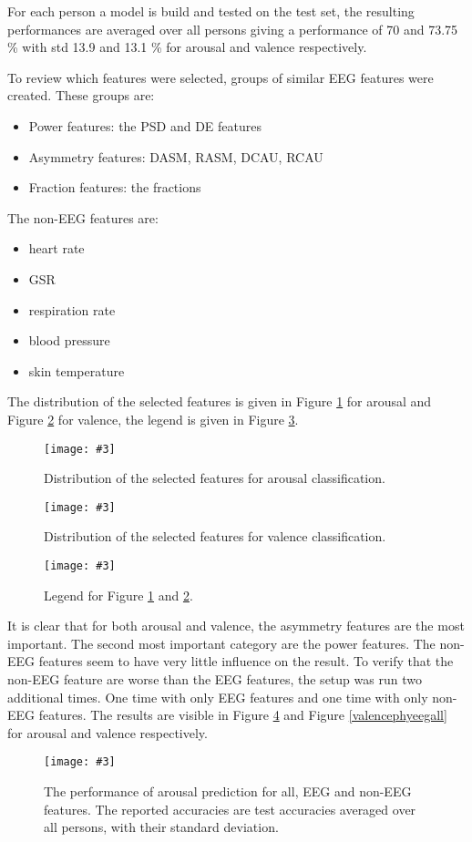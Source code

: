 \documentclass[12pt,journal,compsoc]{IEEEtran}
\newcommand{\npar}{\par \vspace{2.3ex plus 0.3ex minus 0.3ex}}
\newcommand{\mijnfiguur}[4][H]{            %
    \begin{figure}[#1]                      %
        \begin{center}                      %
            \texttt{[image: \#3]}        %
            \caption{#4\label{#3}}          %
        \end{center}
    \end{figure}
    }
\begin{document}
\npar

For each person a model is build and tested on the test set, the resulting performances are averaged over all persons giving a performance of  70 and 73.75 \% with std 13.9 and 13.1 \% for arousal and valence respectively. 

\npar

To review which features were selected, groups of similar EEG features were created. These groups are:
\begin{itemize}
\item Power features: the PSD and DE features
\item Asymmetry features: DASM, RASM, DCAU, RCAU
\item Fraction features: the fractions
\end{itemize}
The non-EEG features are:
\begin{itemize}
\item heart rate
\item GSR
\item respiration rate
\item blood pressure
\item skin temperature
\end{itemize}
The distribution of the selected features is given in Figure \ref{arousalALLRF} for arousal and Figure \ref{valenceALLRF} for valence, the legend is given in Figure \ref{legend}.

\mijnfiguur{width=0.25\textwidth}{arousalALLRF}{Distribution of the selected features for arousal classification.}
\mijnfiguur{width=0.25\textwidth}{valenceALLRF}{Distribution of the selected features for valence classification.}
\mijnfiguur{width=0.25\textwidth}{legend}{Legend for Figure \ref{arousalALLRF} and \ref{valenceALLRF}.}

It is clear that for both arousal and valence, the asymmetry features are the most important. The second most important category are the power features. The non-EEG features seem to have very little influence on the result. To verify that the non-EEG feature are worse than the EEG features, the setup was run two additional times. One time with only EEG features and one time with only non-EEG features. The results are visible in Figure \ref{arousalphyeegall} and Figure \ref{valencephyeegall} for arousal and valence respectively. 

\mijnfiguur{width=.5\textwidth}{arousalphyeegall}{The performance of arousal prediction for all, EEG and non-EEG features. The reported accuracies are test accuracies averaged over all persons, with their standard deviation.}
\end{document}
